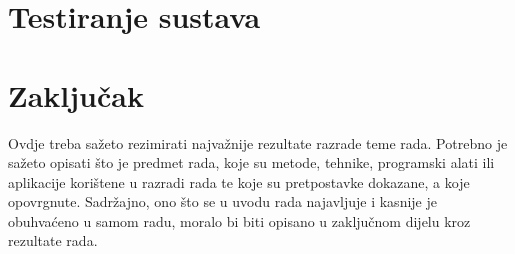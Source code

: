\documentclass{foi}
\begin{document}
\chapter{Testiranje sustava}

\chapter{Zaključak}

Ovdje treba sažeto rezimirati najvažnije rezultate razrade teme rada. Potrebno je sažeto opisati što je predmet rada, koje su metode, tehnike, programski alati ili aplikacije korištene u razradi rada te koje su pretpostavke dokazane, a koje opovrgnute. Sadržajno, ono što se u uvodu rada najavljuje i kasnije je obuhvaćeno u samom radu, moralo bi biti opisano u zaključnom dijelu kroz rezultate rada.

\printbibliography[title=Popis literature]

\listoffigures
{}
 
\listoftables
{}
\end{document}

